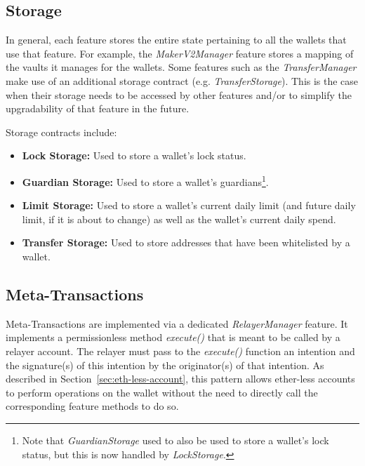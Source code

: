 \documentclass[12pt]{article}
\begin{document}
\subsection{Storage}
\label{sec:storage}
In general, each feature stores the entire state pertaining to all the wallets that use that feature. For example, the \emph{MakerV2Manager} feature stores a mapping of the vaults it manages for the wallets. Some features such as the \emph{TransferManager} make use of an additional storage contract (e.g. \emph{TransferStorage}). This is the case when their storage needs to be accessed by other features and/or to simplify the upgradability of that feature in the future.

Storage contracts include:
\begin{itemize}
\item \textbf{Lock Storage:} Used to store a wallet's lock status.
\item \textbf{Guardian Storage:} Used to store a wallet's guardians\footnote{Note that \emph{GuardianStorage} used to also be used to store a wallet's lock status, but this is now handled by \emph{LockStorage}.}.
\item \textbf{Limit Storage:} Used to store a wallet's current daily limit (and future daily limit, if it is about to change) as well as the wallet's current daily spend.
\item \textbf{Transfer Storage:} Used to store addresses that have been whitelisted by a wallet.
\end{itemize}

\subsection{Meta-Transactions}
\label{sec:meta-transactions}
Meta-Transactions are implemented via a dedicated \emph{RelayerManager} feature. It implements a permissionless method \emph{execute()} that is meant to be called by a relayer account. The relayer must pass to the \emph{execute()} function an intention and the signature(s) of this intention by the originator(s) of that intention. As described in Section~\ref{sec:eth-less-account}, this pattern allows ether-less accounts to perform operations on the wallet without the need to directly call the corresponding feature methods to do so.
\end{document}
